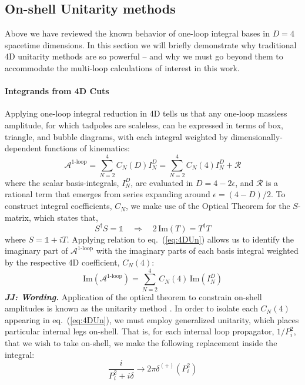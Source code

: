 \documentclass[11pt,letter]{article}
\def\eqn#1{eq.~(\ref{#1})}
\def\dj#1{{\color{NUpurple}\it \bf JJ: #1}}
\begin{document}
\subsection{On-shell Unitarity methods}\label{sec:genU}
Above we have reviewed the known behavior of one-loop integral bases in $D=4$ spacetime dimensions. In this section we will briefly demonstrate why traditional 4D unitarity methods are so powerful -- and why we must go beyond them to accommodate the multi-loop calculations of interest in this work. 
\paragraph{Integrands from 4D Cuts}
Applying one-loop integral reduction in 4D tells us that any one-loop massless amplitude, for which tadpoles are scaleless, can be expressed in terms of box, triangle, and bubble diagrams, with each integral weighted by dimensionally-dependent functions of kinematics:
\begin{equation}\label{eq:4DUn}
\mathcal{A}^{\text{1-loop}}= \sum_{N=2}^4 C_N(D)I_N^D = \sum_{N=2}^4 C_N(4)I_N^D+ \mathcal{R}
\end{equation}
where the scalar basis-integrals, $I_N^D$, are evaluated in $D=4-2\epsilon$, and $\mathcal{R}$ is a rational term that emerges from series expanding around $\epsilon=(4-D)/2$. To construct integral coefficients, $C_N$, we make use of the Optical Theorem for the $S$-matrix, which states that,
\begin{equation}
S^\dagger S = \mathbb{1} \quad \Rightarrow \quad 2\,\text{Im}(T) = T^\dagger T
\end{equation}
where $S=\mathbb{1}+iT$. Applying relation to \eqn{eq:4DUn} allows us to identify the imaginary part of $\mathcal{A}^{\text{1-loop}}$ with the imaginary parts of each basis integral weighted by the respective 4D coefficient, $C_N(4)$:
\begin{equation}\label{eq:UnMeth1loop}
\text{Im}(\mathcal{A}^{\text{1-loop}}) = \sum_{N=2}^4 C_N(4)\, \text{Im}(I_N^D)
\end{equation}
\dj{Wording.} Application of the optical theorem to constrain on-shell amplitudes is known as the unitarity method \cite{UnitarityMethod, BDKUniarityReview}. In order to isolate each $C_N(4)$ appearing in \eqn{eq:4DUn}, we must employ {generalized unitarity}, which places particular internal legs on-shell. That is, for each internal loop propagator, $1/P_i^2$, that we wish to take on-shell, we make the following replacement inside the integral:
\begin{equation}
\frac{i}{P_i^2 + i\delta} \rightarrow 2\pi \delta^{(+)}(P_i^2)
\end{equation}
\end{document}
